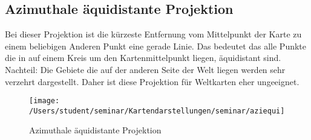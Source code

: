 \subsection{Azimuthale äquidistante Projektion}
\label{sec:azimuequi}
Bei dieser Projektion ist die kürzeste Entfernung vom Mittelpunkt der Karte zu einem beliebigen Anderen Punkt
eine gerade Linie. Das bedeutet das alle Punkte die in auf einem Kreis um den Kartenmittelpunkt liegen, äquidistant sind.
Nachteil:\newline
Die Gebiete die auf der anderen Seite der Welt liegen werden sehr verzehrt dargestellt. Daher ist diese Projektion für Weltkarten 
eher ungeeignet.\\
\begin{figure}[hbtp]
\centering
\texttt{[image: /Users/student/seminar/Kartendarstellungen/seminar/aziequi]} \\
\caption{Azimuthale äquidistante Projektion}
\end{figure}
\clearpage